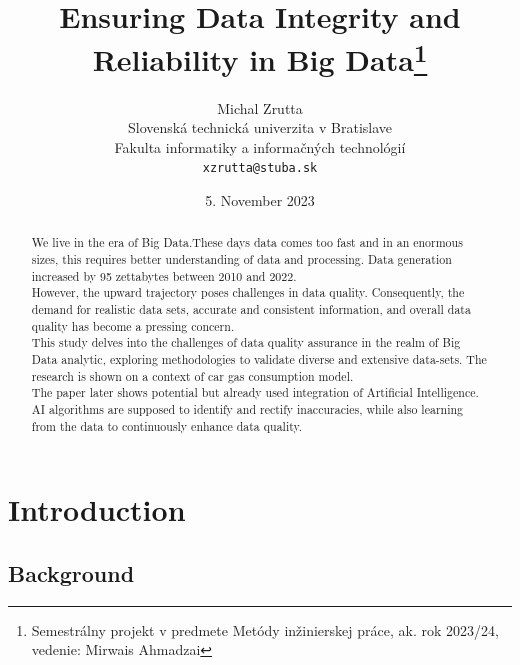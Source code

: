 \documentclass[10pt,a4paper]{article}
\title{Ensuring Data Integrity and Reliability in Big Data\thanks{Semestrálny projekt v predmete Metódy inžinierskej práce, ak. rok 2023/24, vedenie: Mirwais Ahmadzai}}
\author{Michal Zrutta \\[2pt]
	{\small Slovenská technická univerzita v Bratislave}\\
	{\small Fakulta informatiky a informačných technológií}\\
	{\small \texttt{xzrutta@stuba.sk}}
}
\date{\small 5. November 2023}
\begin{document}
\maketitle



\begin{abstract}

We live in the era of Big Data.These days data comes too fast and in an enormous sizes, this requires better understanding of data and processing. Data generation increased by 95 zettabytes between 2010 and 2022.\\However, the upward trajectory poses challenges in data quality. Consequently, the demand for realistic data sets, accurate and consistent information, and overall data quality has become a pressing concern.\\This study delves into the challenges of data quality assurance in the realm of Big Data analytic, exploring methodologies to validate diverse and extensive data-sets. The research is shown on a context of car gas consumption model.\\The paper later shows potential but already used integration of Artificial Intelligence. AI algorithms are supposed to identify and rectify inaccuracies, while also learning from the data to continuously enhance data quality.
\end{abstract}



\section{Introduction}

\subsection{Background}
\end{document}
